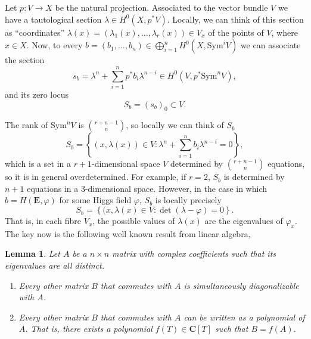 \documentclass[12pt,a4paper]{book}
\newtheorem{lema}[thm]{Lemma}
\theoremstyle{definition} \newtheorem{defn}[thm]{Definition}
\theoremstyle{definition} \newtheorem{ejemplo}[thm]{Example}
\theoremstyle{remark} \newtheorem{rem}[thm]{Remark}
\def\CC{\mathbf{C}}
\def\Sym{\mathrm{Sym}}
\newcommand{\ve}[1]{\mathbf{#1}}
\begin{document}
  Let $p:V\rightarrow X$ be the natural projection. Associated to the vector bundle $V$ we have a tautological section $\lambda \in H^0(X,p^*V)$. Locally, we can think of this section as ``coordinates'' $\lambda(x)=(\lambda_1(x),\dots,\lambda_r(x)) \in V_x$ of the points of $V$, where $x\in X$. Now, to every $b=(b_1,\dots,b_n) \in \bigoplus_{i=1}^n H^0(X,\Sym^i V)$ we can associate the section
  \begin{equation*}
    s_b = \lambda^n + \sum_{i=1}^n p^* b_i \lambda^{n-i} \in H^0(V,p^* \Sym^n V),
  \end{equation*}
  and its zero locus 
  \begin{equation*}
    S_b  = (s_b)_0 \subset V.
  \end{equation*}

  The rank of $\Sym^n V$ is ${r+n-1 \choose n}$, so locally we can think of $S_b$ 
  \begin{equation*}
    S_b = \left\{(x,\lambda(x)) \in V: \lambda^n + \sum_{i=1}^n b_i \lambda^{n-i}=0\right\},
  \end{equation*}
  which is a set in a $r+1$-dimensional space $V$ determined by ${r+n-1 \choose n}$ equations, so it is in general overdetermined. For example, if $r=2$, $S_b$ is determined by $n+1$ equations in a $3$-dimensional space. However, in the case in which $b=H(\ve{E},\varphi)$ for some Higgs field $\varphi$, $S_b$ is locally precisely 
  \begin{equation*}
    S_b=\left\{ (x,\lambda(x) \in V : \det(\lambda- \varphi)=0 \right\}.
  \end{equation*}
  That is, in each fibre $V_x$, the possible values of $\lambda(x)$ are the eigenvalues of $\varphi_x$. The key now is the following well known result from linear algebra,
  \begin{lema}\label{commuting}
    Let $A$ be a $n\times n$ matrix with complex coefficients such that its eigenvalues are all distinct.
    \begin{enumerate}
      \item Every other matrix $B$ that commutes with $A$ is simultaneously diagonalizable with $A$.
      \item Every other matrix $B$ that commutes with $A$ can be written as a polynomial of $A$. That is, there exists a polynomial $f(T) \in \CC[T]$ such that $B=f(A)$.
    \end{enumerate}
  \end{lema}
\end{document}
